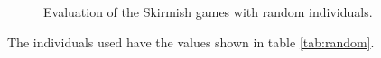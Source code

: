 \begin{figure}[h]
    \caption{Evaluation of the Skirmish games with random individuals.}
    \label{fig:randomSkirmish}
\end{figure}
The individuals used have the values shown in table \ref{tab:random}.
